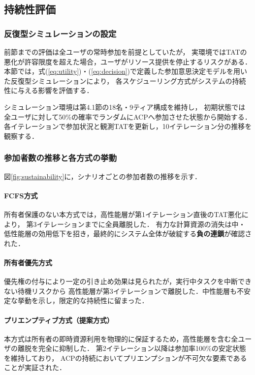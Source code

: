 \documentclass[12pt,a4paper]{jsarticle}
\begin{document}
\subsection{持続性評価}

\subsubsection{反復型シミュレーションの設定}

前節までの評価は全ユーザの常時参加を前提としていたが，
実環境ではTATの悪化が許容限度を超えた場合，ユーザがリソース提供を停止するリスクがある．
本節では，式(\ref{eq:utility})・(\ref{eq:decision})で定義した参加意思決定モデルを用いた反復型シミュレーションにより，
各スケジューリング方式がシステムの持続性に与える影響を評価する．

シミュレーション環境は第4.1節の18名・9ティア構成を維持し，
初期状態では全ユーザに対して50\%の確率でランダムにACPへ参加させた状態から開始する．
各イテレーションで参加状況と観測TATを更新し，10イテレーション分の推移を観察する．

\subsubsection{参加者数の推移と各方式の挙動}

図\ref{fig:sustainability}に，シナリオごとの参加者数の推移を示す．

\paragraph{FCFS方式}
所有者保護のない本方式では，高性能層が第1イテレーション直後のTAT悪化により，
第3イテレーションまでに全員離脱した．
有力な計算資源の消失は中・低性能層の効用低下を招き，最終的にシステム全体が破綻する\textbf{負の連鎖}が確認された．

\paragraph{所有者優先方式}
優先権の付与により一定の引き止め効果は見られたが，実行中タスクを中断できない待機リスクから
高性能層が第3イテレーションで離脱した．中性能層も不安定な挙動を示し，限定的な持続性に留まった．

\paragraph{プリエンプティブ方式（提案方式）}
本方式は所有者の即時資源利用を物理的に保証するため，高性能層を含む全ユーザの離脱を完全に抑制した．
第2イテレーション以降は参加率100\%の安定状態を維持しており，
ACPの持続においてプリエンプションが不可欠な要素であることが実証された．
\end{document}
